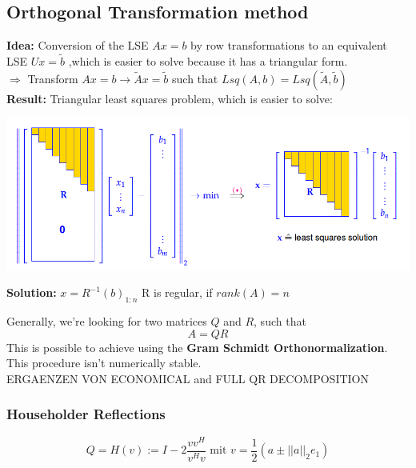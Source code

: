 \documentclass[12pt, a4paper]{article}
\begin{document}
\subsection{Orthogonal Transformation method}
\begin{tcolorbox}
	\textbf{Idea:} Conversion of the LSE $Ax=b$ by row transformations to an equivalent LSE $Ux=\tilde b$ ,which is easier to solve because it has a triangular form. \vspace{2mm}\\
$\Rightarrow$ Transform $Ax=b \longrightarrow \tilde Ax = \tilde b$ such that $Lsq(A,b) = Lsq(\tilde A, \tilde b)$ \\

\textbf{Result:} Triangular least squares problem, which is easier to solve:
\begin{center}
	\includegraphics[width=380pt]{orthogonalTransformation_1.png}
\end{center}

\textbf{Solution:} \quad $x=R^{-1}(b)_{1:n}$ \hspace{35mm} R is regular, if $rank(A)=n$
\end{tcolorbox}

\vspace{10mm}


Generally, we're looking for two matrices $Q$ and $R$, such that
\begin{equation*}
	A = QR
\end{equation*}
This is possible to achieve using the \textbf{Gram Schmidt Orthonormalization}. This procedure isn't numerically stable. \\

ERGAENZEN VON ECONOMICAL and FULL QR DECOMPOSITION

\subsubsection{Householder Reflections}

\begin{tcolorbox}
\begin{equation*}
	Q = H(v) := I - 2\frac{vv^H}{v^Hv}\text{ mit } v = \frac{1}{2}(a \pm ||a||_2 e_1)
\end{equation*}
\end{tcolorbox}
\end{document}
